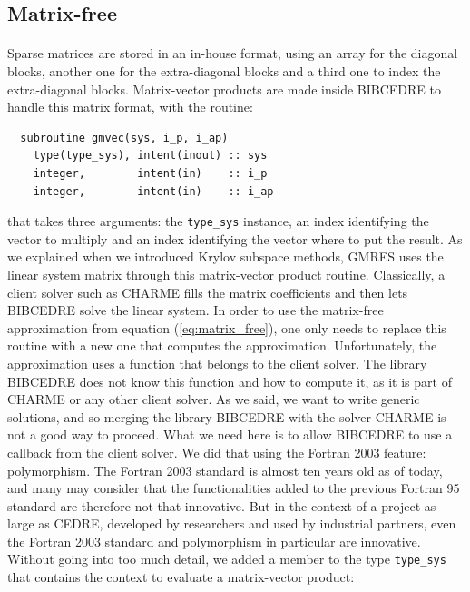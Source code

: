     \subsection{Matrix-free}

      \paragraph{}
      Sparse matrices are stored in an in-house format, using an array for the diagonal blocks, another one for the extra-diagonal blocks and a third one to index the extra-diagonal blocks.
      Matrix-vector products are made inside BIBCEDRE to handle this matrix format, with the routine:
\begin{verbatim}
  subroutine gmvec(sys, i_p, i_ap)
    type(type_sys), intent(inout) :: sys
    integer,        intent(in)    :: i_p
    integer,        intent(in)    :: i_ap
\end{verbatim}
      that takes three arguments: the \texttt{type_sys} instance, an index identifying the vector to multiply and an index identifying the vector where to put the result.
      As we explained when we introduced Krylov subspace methods, GMRES uses the linear system matrix through this matrix-vector product routine.
      Classically, a client solver such as CHARME fills the matrix coefficients and then lets BIBCEDRE solve the linear system.
      In order to use the matrix-free approximation from equation (\ref{eq:matrix_free}), one only needs to replace this routine with a new one that computes the approximation.
      Unfortunately, the approximation uses a function that belongs to the client solver.
      The library BIBCEDRE does not know this function and how to compute it, as it is part of CHARME or any other client solver.
      As we said, we want to write generic solutions, and so merging the library BIBCEDRE with the solver CHARME is not a good way to proceed.
      What we need here is to allow BIBCEDRE to use a callback from the client solver.
      We did that using the Fortran 2003 feature: polymorphism.
      The Fortran 2003 standard is almost ten years old as of today, and many may consider that the functionalities added to the previous Fortran 95 standard are therefore not that innovative.
      But in the context of a project as large as CEDRE, developed by researchers and used by industrial partners, even the Fortran 2003 standard and polymorphism in particular are innovative.
      Without going into too much detail, we added a member to the type \texttt{type_sys} that contains the context to evaluate a matrix-vector product:
